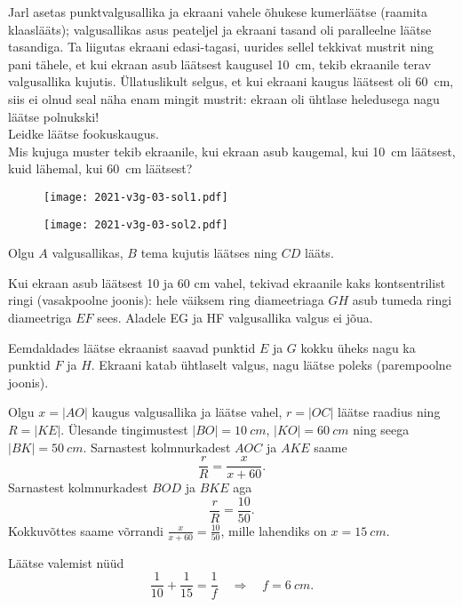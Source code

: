 
Jarl asetas punktvalgusallika ja ekraani vahele õhukese kumerläätse (raamita klaaslääts); valgusallikas asus peateljel ja ekraani tasand oli paralleelne läätse tasandiga. Ta liigutas ekraani edasi-tagasi, uurides sellel tekkivat mustrit ning pani tähele, et kui ekraan asub läätsest kaugusel \SI{10}{\cm}, tekib ekraanile terav valgusallika kujutis. Üllatuslikult selgus, et kui ekraani kaugus läätsest oli \SI{60}{\cm}, siis ei olnud seal näha enam mingit mustrit: ekraan oli ühtlase heledusega nagu läätse polnukski!\\
\osa Leidke läätse fookuskaugus.\\
\osa Mis kujuga muster tekib ekraanile, kui ekraan asub kaugemal, kui \SI{10}{\cm} läätsest, kuid lähemal, kui \SI{60}{\cm} läätsest?



\hint

\solu
\par
\begin{figure}[!h]
  \centering
  \begin{minipage}[c]{0.39\textwidth}
    \texttt{[image: 2021-v3g-03-sol1.pdf]}
  \end{minipage}
  \hfill
  \begin{minipage}[c]{0.60\textwidth}
    \vspace*{-2pt}
    \texttt{[image: 2021-v3g-03-sol2.pdf]}
  \end{minipage}
\end{figure}

Olgu $A$ valgusallikas, $B$ tema kujutis läätses ning $CD$ lääts.

Kui ekraan asub läätsest 10 ja 60 cm vahel, tekivad ekraanile kaks kontsentrilist ringi (vasakpoolne joonis): hele väiksem ring diameetriaga $GH$ asub tumeda ringi diameetriga $EF$ sees. Aladele EG ja HF valgusallika valgus ei jõua.

Eemdaldades läätse ekraanist saavad punktid $E$ ja $G$ kokku üheks nagu ka punktid $F$ ja $H$. Ekraani katab ühtlaselt valgus, nagu läätse poleks (parempoolne joonis).

Olgu $x=|AO|$ kaugus valgusallika ja läätse vahel, $r=|OC|$ läätse raadius ning $R=|KE|$. Ülesande tingimustest $|BO|=\SI{10}{cm}$, $|KO|=\SI{60}{cm}$ ning seega $|BK|=\SI{50}{cm}$. Sarnastest kolmnurkadest $AOC$ ja $AKE$ saame
\[
  \frac{r}{R}=\frac{x}{x+60}.
\]
Sarnastest kolmnurkadest $BOD$ ja $BKE$ aga
\[
  \frac{r}{R}=\frac{10}{50}.
\]
Kokkuvõttes saame võrrandi $\displaystyle{\frac{x}{x+60}=\frac{10}{50}}$, mille lahendiks on $x=\SI{15}{cm}$.

Läätse valemist nüüd
\[
  \frac{1}{10}+\frac{1}{15}=\frac{1}{f}\quad \Rightarrow \quad f=\SI{6}{cm}.
\]
\probend